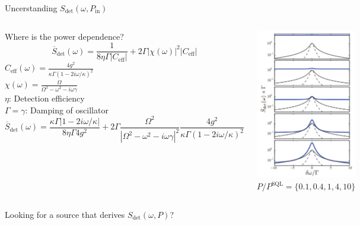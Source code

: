 \begin{frame}{Uncerstanding $S_\text{det}(\omega, P_\text{in})$}
	\begin{columns}
		Where is the power dependence?
		$$
		\overline S_\text{det}(\omega)
		= \frac{1}{8 \eta \Gamma |C_\text{eff}|}
		+ 2 \Gamma |\chi(\omega)|^2 |C_\text{eff}|
		$$
		$C_\text{eff}(\omega) = \frac{4 g^2}{\kappa \Gamma(1-2 i\omega /\kappa)^2}$\\
		$\chi(\omega) = \frac{\Omega}{\Omega^2 - \omega^2 - i\omega\gamma}$ \\
		$\eta$: Detection efficiency\\
		$\Gamma = \gamma$: Damping of oscillator\\
		
		\tiny 
		$$
		\overline S_\text{det}(\omega)
		= \frac{\kappa\Gamma |1-2i\omega/\kappa|}{8 \eta \Gamma 4 g^2}
		+ 2 \Gamma \frac{\Omega^2}{|\Omega^2-\omega^2-i\omega\gamma|^2}
		\frac{4 g^2}{\kappa \Gamma(1-2 i\omega /\kappa)^2}
		$$
		

		\small\centering
		\includegraphics[width=\textwidth]{figures/3.5.png}
		$P/P^\text{SQL} = \{0.1, 0.4, 1, 4, 10\}$

	\end{columns}
\end{frame}

\begin{frame}
	\centering
	Looking for a source that derives $S_\text{det}(\omega, P)$?\\
\end{frame}